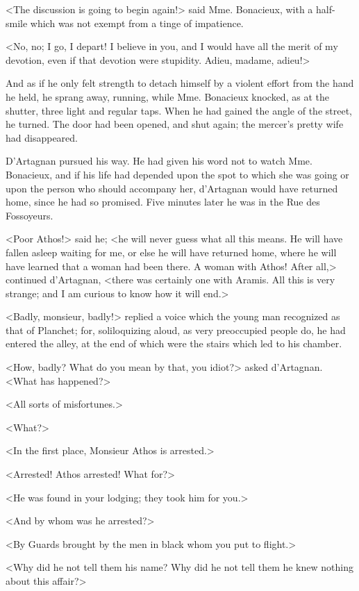 <The discussion is going to begin again!> said Mme. Bonacieux, with a half-smile which was not exempt from a tinge of impatience. 

<No, no; I go, I depart! I believe in you, and I would have all the merit of my devotion, even if that devotion were stupidity. Adieu, madame, adieu!> 

And as if he only felt strength to detach himself by a violent effort from the hand he held, he sprang away, running, while Mme. Bonacieux knocked, as at the shutter, three light and regular taps. When he had gained the angle of the street, he turned. The door had been opened, and shut again; the mercer's pretty wife had disappeared. 

D'Artagnan pursued his way. He had given his word not to watch Mme. Bonacieux, and if his life had depended upon the spot to which she was going or upon the person who should accompany her, d'Artagnan would have returned home, since he had so promised. Five minutes later he was in the Rue des Fossoyeurs. 

<Poor Athos!> said he; <he will never guess what all this means. He will have fallen asleep waiting for me, or else he will have returned home, where he will have learned that a woman had been there. A woman with Athos! After all,> continued d'Artagnan, <there was certainly one with Aramis. All this is very strange; and I am curious to know how it will end.> 

<Badly, monsieur, badly!> replied a voice which the young man recognized as that of Planchet; for, soliloquizing aloud, as very preoccupied people do, he had entered the alley, at the end of which were the stairs which led to his chamber. 

<How, badly? What do you mean by that, you idiot?> asked d'Artagnan. <What has happened?> 

<All sorts of misfortunes.> 

<What?> 

<In the first place, Monsieur Athos is arrested.> 

<Arrested! Athos arrested! What for?> 

<He was found in your lodging; they took him for you.> 

<And by whom was he arrested?> 

<By Guards brought by the men in black whom you put to flight.> 

<Why did he not tell them his name? Why did he not tell them he knew nothing about this affair?> 

